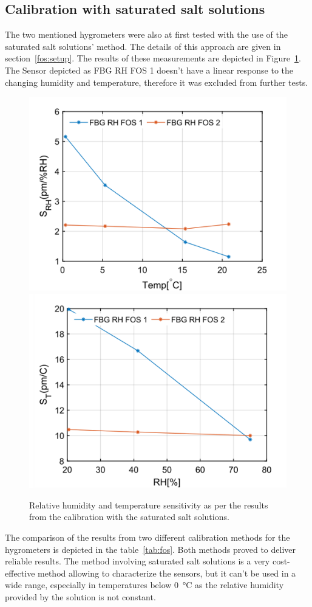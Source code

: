 \subsection{Calibration with saturated salt solutions}
The two mentioned hygrometers were also at first tested with the use of the saturated salt solutions' method. The details of this approach are given in section~\ref{fos:setup}. The results of these measurements are depicted in Figure~\ref{fig:fos_salt}. The Sensor depicted as FBG RH FOS 1 doesn't have a linear response to the changing humidity and temperature, therefore it was excluded from further tests. 

\begin{figure}[!h]
\centering
\includegraphics[width=0.49\columnwidth]{Chapter5/images/salt_srh.png}
\includegraphics[width=0.49\columnwidth]{Chapter5/images/salt_st.png}
\caption{Relative humidity and temperature sensitivity as per the results from the calibration with the saturated salt solutions.}
\label{fig:fos_salt}
\end{figure}

The comparison of the results from two different calibration methods for the hygrometers is depicted in the table~\ref{tab:fos}. Both methods proved to deliver reliable results. The method involving saturated salt solutions is a very cost-effective method allowing to characterize the sensors, but it can't be used in a wide range, especially in temperatures below \SI{0}{\celsius} as the relative humidity provided by the solution is not constant. 


